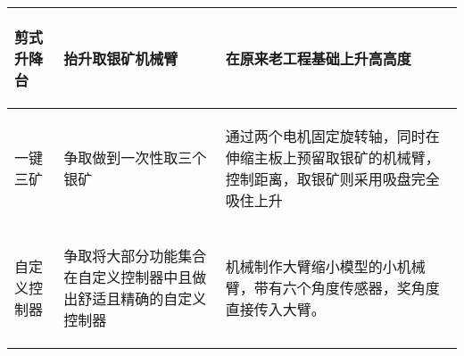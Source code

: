 \begin{longtable}{ p{2cm} | p{7.8cm} | p{6cm} |}
    \hline
    
        \begin{center}
            剪式升降台 
        \end{center} \cellcolor{gndcolor} &
        \begin{center}
            抬升取银矿机械臂
        \end{center} \cellcolor{gndcolor} &
        \begin{center}
            在原来老工程基础上升高高度
        \end{center} \cellcolor{gndcolor} \\

    \hline
    
        \begin{center}
            一键三矿
        \end{center} &
        \begin{center}
            争取做到一次性取三个银矿
        \end{center} &
        \begin{center}
            通过两个电机固定旋转轴，同时在伸缩主板上预留取银矿的机械臂，控制距离，取银矿则采用吸盘完全吸住上升
        \end{center} \\
        
    \hline
    
        \begin{center}
            自定义控制器
        \end{center} &
        \begin{center}
            争取将大部分功能集合在自定义控制器中且做出舒适且精确的自定义控制器
        \end{center} &
        \begin{center}
            机械制作大臂缩小模型的小机械臂，带有六个角度传感器，奖角度直接传入大臂。
        \end{center} \\
        
    \hline
    
\end{longtable}
